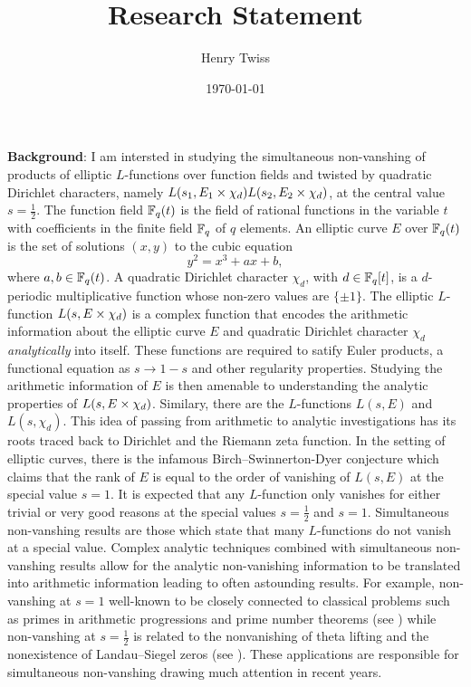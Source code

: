 \documentclass[12pt,reqno,oneside]{amsart}
\title{Research Statement}
\author{Henry Twiss}
\date{\today}
\begin{document}
\maketitle

\textbf{Background}: I am intersted in studying the simultaneous non-vanshing of products of elliptic $L$-functions over function fields and twisted by quadratic Dirichlet characters, namely $L(s_{1},E_{1} \times \chi_{d})L(s_{2},E_{2} \times \chi_{d})$, at the central value $s = \frac{1}{2}$. The function field $\mathbb{F}_{q}(t)$ is the field of rational functions in the variable $t$ with coefficients in the finite field $\mathbb{F}_{q}$ of $q$ elements. An elliptic curve $E$ over $\mathbb{F}_{q}(t)$ is the set of solutions $(x,y)$ to the cubic equation
\[
  y^{2} = x^{3}+ax+b,
\]
where $a,b \in \mathbb{F}_{q}(t)$. A quadratic Dirichlet character $\chi_{d}$, with $d \in \mathbb{F}_{q}[t]$, is a $d$-periodic multiplicative function whose non-zero values are $\{\pm1\}$. The elliptic $L$-function $L(s,E \times \chi_{d})$ is a complex function that encodes the arithmetic information about the elliptic curve $E$ and quadratic Dirichlet character $\chi_{d}$ \textit{analytically} into itself. These functions are required to satify Euler products, a functional equation as $s \to 1-s$ and other regularity properties. Studying the arithmetic information of $E$ is then amenable to understanding the analytic properties of $L(s,E \times \chi_{d})$. Similary, there are the $L$-functions $L(s,E)$ and $L(s, \chi_{d})$. This idea of passing from arithmetic to analytic investigations has its roots traced back to Dirichlet and the Riemann zeta function. In the setting of elliptic curves, there is the infamous Birch–Swinnerton-Dyer conjecture which claims that the rank of $E$ is equal to the order of vanishing of $L(s,E)$ at the special value $s = 1$. It is expected that any $L$-function only vanishes for either trivial or very good reasons at the special values $s = \frac{1}{2}$ and $s = 1$. Simultaneous non-vanshing results are those which state that many $L$-functions do not vanish at a special value. Complex analytic techniques combined with simultaneous non-vanshing results allow for the analytic non-vanishing information to be translated into arithmetic information leading to often astounding results. For example, non-vanshing at $s = 1$ well-known to be closely connected to classical problems such as primes in arithmetic progressions and prime number theorems (see \cite{M}) while non-vanshing at $s = \frac{1}{2}$ is related to the nonvanishing of theta lifting and the nonexistence of Landau–Siegel zeros (see \cite{Da}). These applications are responsible for simultaneous non-vanshing drawing much attention in recent years.
\end{document}
